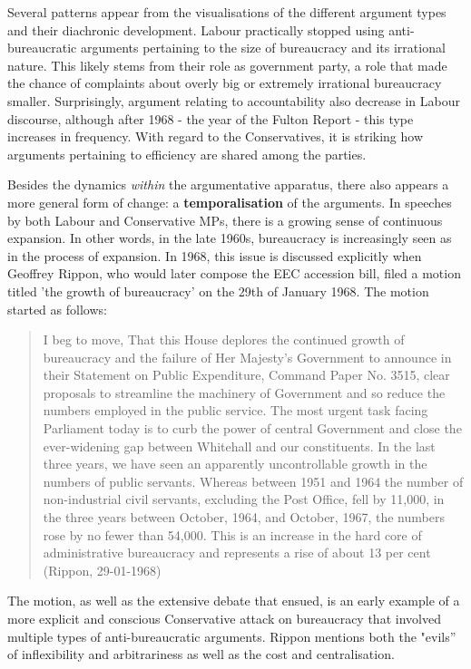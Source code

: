 \documentclass[
]{article}
\begin{document}
Several patterns appear from the visualisations of the different
argument types and their diachronic development. Labour practically
stopped using anti-bureaucratic arguments pertaining to the size of
bureaucracy and its irrational nature. This likely stems from their role
as government party, a role that made the chance of complaints about
overly big or extremely irrational bureaucracy smaller. Surprisingly,
argument relating to accountability also decrease in Labour discourse,
although after 1968 - the year of the Fulton Report - this type
increases in frequency. With regard to the Conservatives, it is striking
how arguments pertaining to efficiency are shared among the parties.

Besides the dynamics \emph{within} the argumentative apparatus, there
also appears a more general form of change: a \textbf{temporalisation}
of the arguments. In speeches by both Labour and Conservative MPs, there
is a growing sense of continuous expansion. In other words, in the late
1960s, bureaucracy is increasingly seen as in the process of expansion.
In 1968, this issue is discussed explicitly when Geoffrey Rippon, who
would later compose the EEC accession bill, filed a motion titled 'the
growth of bureaucracy' on the 29th of January 1968. The motion started
as follows:

\begin{quote}
I beg to move, That this House deplores the continued growth of
bureaucracy and the failure of Her Majesty's Government to announce in
their Statement on Public Expenditure, Command Paper No. 3515, clear
proposals to streamline the machinery of Government and so reduce the
numbers employed in the public service. The most urgent task facing
Parliament today is to curb the power of central Government and close
the ever-widening gap between Whitehall and our constituents. In the
last three years, we have seen an apparently uncontrollable growth in
the numbers of public servants. Whereas between 1951 and 1964 the number
of non-industrial civil servants, excluding the Post Office, fell by
11,000, in the three years between October, 1964, and October, 1967, the
numbers rose by no fewer than 54,000. This is an increase in the hard
core of administrative bureaucracy and represents a rise of about 13 per
cent (Rippon, 29-01-1968)
\end{quote}

The motion, as well as the extensive debate that ensued, is an early
example of a more explicit and conscious Conservative attack on
bureaucracy that involved multiple types of anti-bureaucratic arguments.
Rippon mentions both the "evils'' of inflexibility and arbitrariness as
well as the cost and centralisation.
\end{document}
